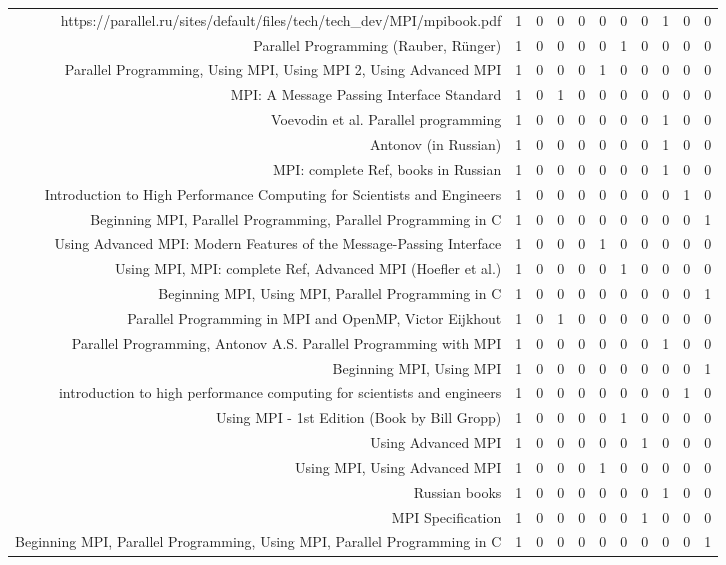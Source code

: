 {\begin{landscape}
\begin{longtable}[htb]{r|c|c|c|c|c|c|c|c|c|c}
{https://parallel.ru/sites/default/files/tech/tech\_dev/MPI/mpibook.pdf} & 1 & 0 & 0 & 0 & 0 & 0 & 0 & 1 & 0 & 0 \\%
{Parallel Programming (Rauber, Rünger)} & 1 & 0 & 0 & 0 & 0 & 1 & 0 & 0 & 0 & 0 \\%
{Parallel Programming, Using MPI, Using MPI 2, Using Advanced MPI} & 1 & 0 & 0 & 0 & 1 & 0 & 0 & 0 & 0 & 0 \\%
{MPI: A Message Passing Interface Standard} & 1 & 0 & 1 & 0 & 0 & 0 & 0 & 0 & 0 & 0 \\%
{Voevodin et al. Parallel programming} & 1 & 0 & 0 & 0 & 0 & 0 & 0 & 1 & 0 & 0 \\%
{Antonov (in Russian)} & 1 & 0 & 0 & 0 & 0 & 0 & 0 & 1 & 0 & 0 \\%
{MPI: complete Ref, books in Russian} & 1 & 0 & 0 & 0 & 0 & 0 & 0 & 1 & 0 & 0 \\%
{Introduction to High Performance Computing for Scientists and Engineers} & 1 & 0 & 0 & 0 & 0 & 0 & 0 & 0 & 1 & 0 \\%
{Beginning MPI, Parallel Programming, Parallel Programming in C} & 1 & 0 & 0 & 0 & 0 & 0 & 0 & 0 & 0 & 1 \\%
{Using Advanced MPI: Modern Features of the Message-Passing Interface} & 1 & 0 & 0 & 0 & 1 & 0 & 0 & 0 & 0 & 0 \\%
{Using MPI, MPI: complete Ref, Advanced MPI (Hoefler et al.)} & 1 & 0 & 0 & 0 & 0 & 1 & 0 & 0 & 0 & 0 \\%
{Beginning MPI, Using MPI, Parallel Programming in C} & 1 & 0 & 0 & 0 & 0 & 0 & 0 & 0 & 0 & 1 \\%
{Parallel Programming in MPI and OpenMP, Victor Eijkhout} & 1 & 0 & 1 & 0 & 0 & 0 & 0 & 0 & 0 & 0 \\%
{Parallel Programming, Antonov A.S. Parallel Programming with MPI} & 1 & 0 & 0 & 0 & 0 & 0 & 0 & 1 & 0 & 0 \\%
{Beginning MPI, Using MPI} & 1 & 0 & 0 & 0 & 0 & 0 & 0 & 0 & 0 & 1 \\%
{introduction to high performance computing for scientists and engineers} & 1 & 0 & 0 & 0 & 0 & 0 & 0 & 0 & 1 & 0 \\%
{Using MPI - 1st Edition (Book by Bill Gropp)} & 1 & 0 & 0 & 0 & 0 & 1 & 0 & 0 & 0 & 0 \\%
{Using Advanced MPI} & 1 & 0 & 0 & 0 & 0 & 0 & 1 & 0 & 0 & 0 \\%
{Using MPI, Using Advanced MPI} & 1 & 0 & 0 & 0 & 1 & 0 & 0 & 0 & 0 & 0 \\%
{Russian books} & 1 & 0 & 0 & 0 & 0 & 0 & 0 & 1 & 0 & 0 \\%
{MPI Specification} & 1 & 0 & 0 & 0 & 0 & 0 & 1 & 0 & 0 & 0 \\%
{Beginning MPI, Parallel Programming, Using MPI, Parallel Programming in C} & 1 & 0 & 0 & 0 & 0 & 0 & 0 & 0 & 0 & 1 \\%
\hline%
\end{longtable}%
\end{landscape}}%
\clearpage%
